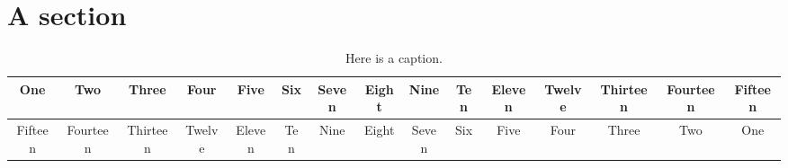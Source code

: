 \documentclass{IEEEtran}%
\begin{document}
\section{A section}
\begin{table*}[t]
  \centering
  \begin{tabular}{*{15}{c}}
    \hline
    One & Two & Three & Four & Five & Six & Seven & Eight & Nine & Ten & Eleven & Twelve & Thirteen & Fourteen & Fifteen \\
    \hline
    Fifteen & Fourteen & Thirteen & Twelve & Eleven & Ten & Nine & Eight & Seven & Six & Five & Four & Three & Two & One \\
    \hline
  \end{tabular}
  \caption{Here is a caption.}
\end{table*}
\lipsum[1-20]
\end{document}
